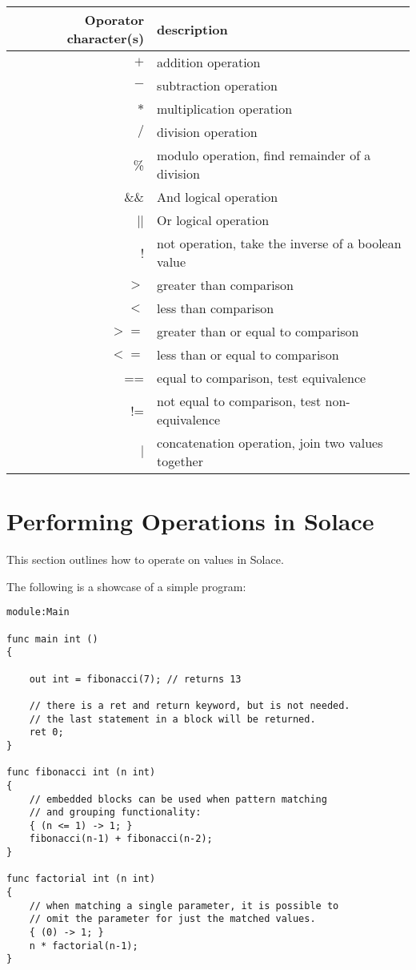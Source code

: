 \documentclass{article}
\begin{document}
\begin{center}
\begin{tabular}{|r|l|}
\hline
Oporator character(s) & description \\
\hline
\hline
$+$ & addition operation \\
$-$ & subtraction operation \\
$*$ & multiplication operation \\
$/$ & division operation \\
\% & modulo operation, find remainder of a division \\
\hline
\hline
\&\& & And logical operation \\
|| & Or logical operation \\
! & not operation, take the inverse of a boolean value \\
\hline
$>$ & greater than comparison \\
$<$ & less than comparison \\
$>=$ & greater than or equal to comparison \\
$<=$ & less than or equal to comparison \\
== & equal to comparison, test equivalence \\
!= & not equal to comparison, test non-equivalence \\
\hline
\hline
$|$ & concatenation operation, join two values together \\
\hline
\end{tabular}
\end{center}


\section{Performing Operations in Solace}

This section outlines how to operate on values in Solace.


The following is a showcase of a simple program:
\begin{lstlisting}
module:Main

func main int ()
{
	
	out int = fibonacci(7); // returns 13
	
	// there is a ret and return keyword, but is not needed.
	// the last statement in a block will be returned.
	ret 0;
}

func fibonacci int (n int)
{
	// embedded blocks can be used when pattern matching
	// and grouping functionality:
	{ (n <= 1) -> 1; }
	fibonacci(n-1) + fibonacci(n-2);
}

func factorial int (n int)
{
	// when matching a single parameter, it is possible to
	// omit the parameter for just the matched values.
	{ (0) -> 1; }
	n * factorial(n-1);
}
\end{lstlisting}
\end{document}
